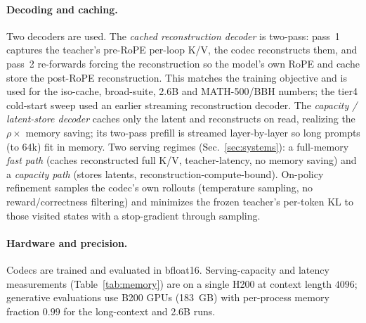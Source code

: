 {\paragraph{Decoding and caching.} Two decoders are used. The \emph{cached reconstruction decoder}
is two-pass: pass~1 captures the teacher's pre-RoPE per-loop K/V, the codec reconstructs them,
and pass~2 re-forwards forcing the reconstruction so the model's own RoPE and cache store the
post-RoPE reconstruction. This matches the training objective and is used for the iso-cache, broad-suite, 2.6B and MATH-500/BBH numbers; the tier4 cold-start sweep used an earlier streaming reconstruction decoder. The \emph{capacity /
latent-store decoder} caches only the latent and reconstructs on read, realizing the $\rho\times$
memory saving; its two-pass prefill is streamed layer-by-layer so long prompts (to $64$k) fit in
memory. Two serving regimes (Sec.~\ref{sec:systems}): a full-memory \emph{fast path} (caches
reconstructed full K/V, teacher-latency, no memory saving) and a \emph{capacity path} (stores
latents, reconstruction-compute-bound). On-policy refinement samples the codec's own rollouts
(temperature sampling, no reward/correctness filtering) and minimizes the frozen teacher's
per-token KL to those visited states with a stop-gradient through sampling.

\paragraph{Hardware and precision.} Codecs are trained and evaluated in bfloat16. Serving-capacity
and latency measurements (Table~\ref{tab:memory}) are on a single H200 at context length $4096$;
generative evaluations use B200 GPUs (183~GB) with per-process memory fraction $0.99$
for the long-context and 2.6B runs.

}
